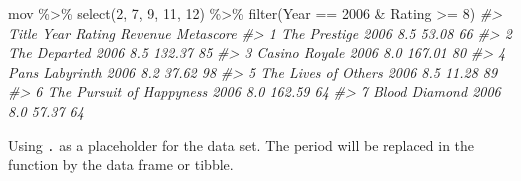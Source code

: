 \documentclass[
]{book}
\newenvironment{Shaded}{\begin{snugshade}}{\end{snugshade}}
\newcommand{\CommentTok}[1]{\textcolor[rgb]{0.56,0.35,0.01}{\textit{#1}}}
\newcommand{\DecValTok}[1]{\textcolor[rgb]{0.00,0.00,0.81}{#1}}
\newcommand{\FunctionTok}[1]{\textcolor[rgb]{0.00,0.00,0.00}{#1}}
\newcommand{\NormalTok}[1]{#1}
\newcommand{\SpecialCharTok}[1]{\textcolor[rgb]{0.00,0.00,0.00}{#1}}
\begin{document}
\begin{Shaded}
\begin{Highlighting}[]
\NormalTok{mov }\SpecialCharTok{\%\textgreater{}\%}
  \FunctionTok{select}\NormalTok{(}\DecValTok{2}\NormalTok{, }\DecValTok{7}\NormalTok{, }\DecValTok{9}\NormalTok{, }\DecValTok{11}\NormalTok{, }\DecValTok{12}\NormalTok{) }\SpecialCharTok{\%\textgreater{}\%}
  \FunctionTok{filter}\NormalTok{(Year }\SpecialCharTok{==} \DecValTok{2006} \SpecialCharTok{\&}\NormalTok{ Rating }\SpecialCharTok{\textgreater{}=} \DecValTok{8}\NormalTok{)}
\CommentTok{\#\textgreater{}                      Title Year Rating Revenue Metascore}
\CommentTok{\#\textgreater{} 1             The Prestige 2006    8.5   53.08        66}
\CommentTok{\#\textgreater{} 2             The Departed 2006    8.5  132.37        85}
\CommentTok{\#\textgreater{} 3            Casino Royale 2006    8.0  167.01        80}
\CommentTok{\#\textgreater{} 4          Pan\textquotesingle{}s Labyrinth 2006    8.2   37.62        98}
\CommentTok{\#\textgreater{} 5      The Lives of Others 2006    8.5   11.28        89}
\CommentTok{\#\textgreater{} 6 The Pursuit of Happyness 2006    8.0  162.59        64}
\CommentTok{\#\textgreater{} 7            Blood Diamond 2006    8.0   57.37        64}
\end{Highlighting}
\end{Shaded}

Using \texttt{.} as a placeholder for the data set. The period will be replaced in the function by the data frame or tibble.

\begin{Shaded}
\end{Shaded}
\end{document}

